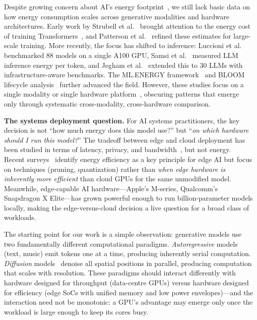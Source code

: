 \documentclass[acmlarge,manuscript,screen,review]{acmart}
\begin{document}
Despite growing concern about AI's energy footprint~\cite{verdecchia2023systematic,wu2022sustainable,schwartz2020green,kaack2022aligning}, we still lack basic data on how energy consumption scales across generative modalities and hardware architectures.
Early work by Strubell et al.~\cite{strubell2019energy} brought attention to the energy cost of training Transformers~\cite{vaswani2017attention}, and Patterson et al.~\cite{patterson2021carbon} refined these estimates for large-scale training.
More recently, the focus has shifted to inference: Luccioni et al.~\cite{luccioni2024power} benchmarked 88 models on a single A100 GPU, Samsi et al.~\cite{samsi2023words} measured LLM inference energy per token, and Jegham et al.~\cite{jegham2025hungry} extended this to 30 LLMs with infrastructure-aware benchmarks.
The ML.ENERGY framework~\cite{you2023zeus} and BLOOM lifecycle analysis~\cite{luccioni2023bloom} further advanced the field.
However, these studies focus on a single modality or single hardware platform~\cite{dodge2022measuring}, obscuring patterns that emerge only through systematic cross-modality, cross-hardware comparison.

\textbf{The systems deployment question.}\quad
For AI systems practitioners, the key decision is not ``how much energy does this model use?'' but ``\emph{on which hardware should I run this model?}''
The tradeoff between edge and cloud deployment has been studied in terms of latency, privacy, and bandwidth~\cite{mao2024green,xu2024edge}, but not energy.
Recent surveys~\cite{mao2024green} identify energy efficiency as a key principle for edge AI but focus on techniques (pruning, quantization) rather than \emph{when edge hardware is inherently more efficient} than cloud GPUs for the same unmodified model.
Meanwhile, edge-capable AI hardware---Apple's M-series, Qualcomm's Snapdragon X Elite---has grown powerful enough to run billion-parameter models locally, making the edge-versus-cloud decision a live question for a broad class of workloads.

The starting point for our work is a simple observation: generative models use two fundamentally different computational paradigms.
\emph{Autoregressive} models (text, music) emit tokens one at a time, producing inherently serial computation.
\emph{Diffusion} models~\cite{rombach2022high,ho2020denoising} denoise all spatial positions in parallel, producing computation that scales with resolution.
These paradigms should interact differently with hardware designed for throughput (data-centre GPUs) versus hardware designed for efficiency (edge SoCs with unified memory and low power envelopes)---and the interaction need not be monotonic: a GPU's advantage may emerge only once the workload is large enough to keep its cores busy.
\end{document}
